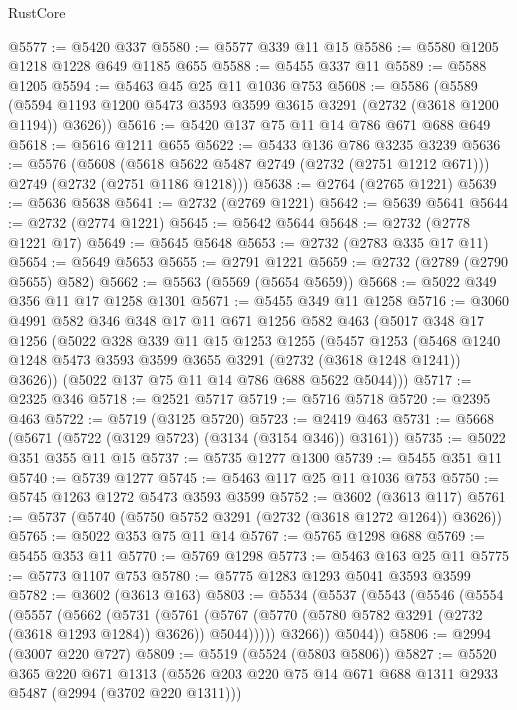 \begin{lexlean}{RustCore}
\begin{coremodule}
@5577 := @5420 @337
@5580 := @5577 @339 @11 @15
@5586 := @5580 @1205 @1218 @1228 @649 @1185 @655
@5588 := @5455 @337 @11
@5589 := @5588 @1205
@5594 := @5463 @45 @25 @11 @1036 @753
@5608 := @5586
    (@5589 (@5594 @1193 @1200 @5473 @3593 @3599 @3615 @3291 (@2732 (@3618 @1200 @1194)) @3626))
@5616 := @5420 @137 @75 @11 @14 @786 @671 @688 @649
@5618 := @5616 @1211 @655
@5622 := @5433 @136 @786 @3235 @3239
@5636 := @5576
    (@5608 (@5618 @5622 @5487 @2749 (@2732 (@2751 @1212 @671))) @2749 (@2732 (@2751 @1186 @1218)))
@5638 := @2764 (@2765 @1221)
@5639 := @5636 @5638
@5641 := @2732 (@2769 @1221)
@5642 := @5639 @5641
@5644 := @2732 (@2774 @1221)
@5645 := @5642 @5644
@5648 := @2732 (@2778 @1221 @17)
@5649 := @5645 @5648
@5653 := @2732 (@2783 @335 @17 @11)
@5654 := @5649 @5653
@5655 := @2791 @1221
@5659 := @2732 (@2789 (@2790 @5655) @582)
@5662 := @5563 (@5569 (@5654 @5659))
@5668 := @5022 @349 @356 @11 @17 @1258 @1301
@5671 := @5455 @349 @11 @1258
@5716 := @3060
    @4991
    @582
    @346
    @348
    @17
    @11
    @671
    @1256
    @582
    @463
    (@5017
      @348
      @17
      @1256
      (@5022
        @328
        @339
        @11
        @15
        @1253
        @1255
        (@5457
          @1253
          (@5468 @1240 @1248 @5473 @3593 @3599 @3655 @3291 (@2732 (@3618 @1248 @1241)) @3626))
        (@5022 @137 @75 @11 @14 @786 @688 @5622 @5044)))
@5717 := @2325 @346
@5718 := @2521 @5717
@5719 := @5716 @5718
@5720 := @2395 @463
@5722 := @5719 (@3125 @5720)
@5723 := @2419 @463
@5731 := @5668 (@5671 (@5722 (@3129 @5723) (@3134 (@3154 @346)) @3161))
@5735 := @5022 @351 @355 @11 @15
@5737 := @5735 @1277 @1300
@5739 := @5455 @351 @11
@5740 := @5739 @1277
@5745 := @5463 @117 @25 @11 @1036 @753
@5750 := @5745 @1263 @1272 @5473 @3593 @3599
@5752 := @3602 (@3613 @117)
@5761 := @5737 (@5740 (@5750 @5752 @3291 (@2732 (@3618 @1272 @1264)) @3626))
@5765 := @5022 @353 @75 @11 @14
@5767 := @5765 @1298 @688
@5769 := @5455 @353 @11
@5770 := @5769 @1298
@5773 := @5463 @163 @25 @11
@5775 := @5773 @1107 @753
@5780 := @5775 @1283 @1293 @5041 @3593 @3599
@5782 := @3602 (@3613 @163)
@5803 := @5534
    (@5537
      (@5543
        (@5546
          (@5554
            (@5557
              (@5662
                (@5731
                  (@5761
                    (@5767 (@5770 (@5780 @5782 @3291 (@2732 (@3618 @1293 @1284)) @3626)) @5044)))))
            @3266))
        @5044))
@5806 := @2994 (@3007 @220 @727)
@5809 := @5519 (@5524 (@5803 @5806))
@5827 := @5520
    @365
    @220
    @671
    @1313
    (@5526 @203 @220 @75 @14 @671 @688 @1311 @2933 @5487 (@2994 (@3702 @220 @1311)))

\end{coremodule}
\end{lexlean}
